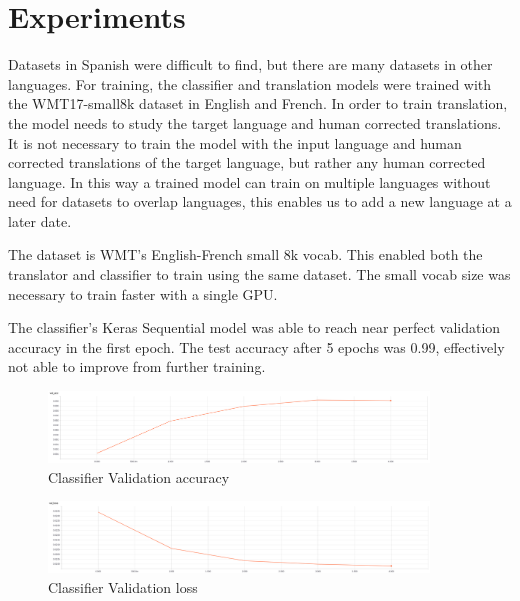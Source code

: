 \documentclass[10pt,a4paper]{article}
\begin{document}
\clearpage


\section{Experiments}


Datasets in Spanish were difficult to find, but there are many datasets in other languages. For training, the classifier and translation models were trained with the WMT17-small8k dataset in English and French. In order to train translation, the model needs to study the target language and human corrected translations. It is not necessary to train the model with the input language and human corrected translations of the target language, but rather any human corrected language. In this way a trained model can train on multiple languages without need for datasets to overlap languages, this enables us to add a new language at a later date.


The dataset is WMT's English-French small 8k vocab. This enabled both the translator and classifier to train using the same dataset. The small vocab size was necessary to train faster with a single GPU.


The classifier's Keras Sequential model was able to reach near perfect validation accuracy in the first epoch. The test accuracy after 5 epochs was 0.99, effectively not able to improve from further training.

\begin{figure}[H]
  \begin{center}
    \includegraphics[width=0.9\textwidth] {val_acc1.png}
    \caption{Classifier Validation accuracy}
  \end{center}
\end{figure}

\begin{figure}[H]
  \begin{center}
    \includegraphics[width=0.9\textwidth] {val_loss1.png}
    \caption{Classifier Validation loss}
  \end{center}
\end{figure}
\end{document}
